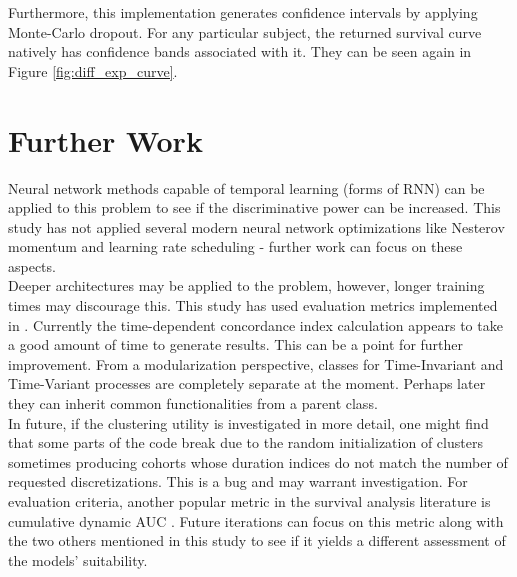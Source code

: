 \documentclass[%
 twocolumn,
 reprint,
 amsmath,amssymb,
 aps,nofootinbib
]{revtex4-2}
\begin{document}
Furthermore, this implementation generates confidence intervals by applying Monte-Carlo dropout. For any particular subject, the returned survival curve natively has confidence bands associated with it. They can be seen again in Figure \ref{fig:diff_exp_curve}.\\



\section{\label{morework}Further Work}
Neural network methods capable of temporal learning (forms of RNN) can be applied to this problem to see if the discriminative power can be increased. This study has not applied several modern neural network optimizations like Nesterov momentum and learning rate scheduling - further work can focus on these aspects. \\

Deeper architectures may be applied to the problem, however, longer training times may discourage this. This study has used evaluation metrics implemented in \cite{kvamme_continuous_2019}. Currently the time-dependent concordance index calculation appears to take a good amount of time to generate results. This can be a point for further improvement. From a modularization perspective, classes for Time-Invariant and Time-Variant processes are completely separate at the moment. Perhaps later they can inherit common functionalities from a parent class.\\

In future, if the clustering utility is investigated in more detail, one might find that some parts of the code break due to the random initialization of clusters sometimes producing cohorts whose duration indices do not match the number of requested discretizations. This is a bug and may warrant investigation. For evaluation criteria, another popular metric in the survival analysis literature is cumulative dynamic AUC \cite{cum_dyn_auc}. Future iterations can focus on this metric along with the two others mentioned in this study to see if it yields a different assessment of the models' suitability.
\end{document}
